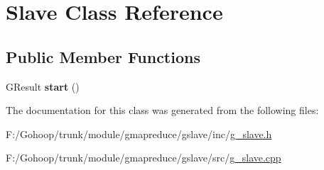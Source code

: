 \hypertarget{class_slave}{\section{Slave Class Reference}
\label{class_slave}
}
\subsection*{Public Member Functions}
\begin{DoxyCompactItemize}
\item 
\hypertarget{class_slave_abf43c4cf118cc76bb40df9fd71ffd8c1}{G\-Result {\bfseries start} ()}\label{class_slave_abf43c4cf118cc76bb40df9fd71ffd8c1}

\end{DoxyCompactItemize}


The documentation for this class was generated from the following files\-:\begin{DoxyCompactItemize}
\item 
F\-:/\-Gohoop/trunk/module/gmapreduce/gslave/inc/\hyperlink{g__slave_8h}{g\-\_\-slave.\-h}\item 
F\-:/\-Gohoop/trunk/module/gmapreduce/gslave/src/\hyperlink{g__slave_8cpp}{g\-\_\-slave.\-cpp}\end{DoxyCompactItemize}

